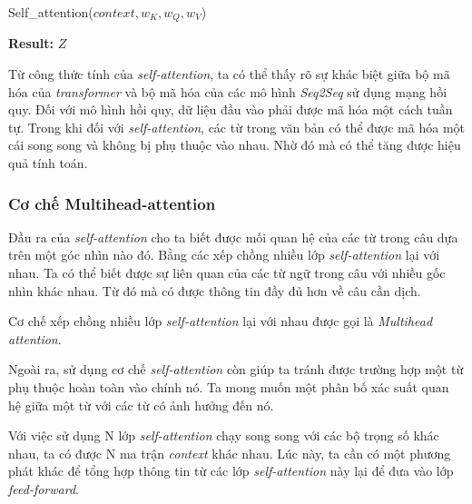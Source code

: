 \begin{algorithm}[H]
    \caption{Self\_attention($context, w_K, w_Q, w_V$)}
    \begin{algorithmic}[1]
		\State \textbf{Result:} $Z$
    \end{algorithmic}
\end{algorithm}

Từ công thức tính của \textit{self-attention}, ta có thể thấy rõ sự khác biệt giữa bộ mã hóa của \textit{transformer} và bộ mã hóa của các mô hình \textit{Seq2Seq} sử dụng mạng hồi quy. Đối với mô hình hồi quy, dữ liệu đầu vào phải được mã hóa một cách tuần tự. Trong khi đối với \textit{self-attention}, các từ trong văn bản có thể được mã hóa một cái song song và không bị phụ thuộc vào nhau. Nhờ đó mà có thể tăng được hiệu quả tính toán.

\subsubsection{Cơ chế Multihead-attention}
Đầu ra của \textit{self-attention} cho ta biết được mối quan hệ của các từ trong câu dựa trên một góc nhìn nào đó. Bằng các xếp chồng nhiều lớp \textit{self-attention} lại với nhau. Ta có thể biết được sự liên quan của các từ ngữ trong câu với nhiều gốc nhìn khác nhau. Từ đó mà có được thông tin đầy đủ hơn về câu cần dịch. 

Cơ chế xếp chồng nhiều lớp \textit{self-attention} lại với nhau được gọi là \textit{Multihead attention}. 

Ngoài ra, sử dụng cơ chế \textit{self-attention} còn giúp ta tránh được trường hợp một từ phụ thuộc hoàn toàn vào chính nó. Ta mong muốn một phân bố xác suất quan hệ giữa một từ với các từ có ảnh hưởng đến nó.

Với việc sử dụng N lớp \textit{self-attention} chạy song song với các bộ trọng số khác nhau, ta có được N ma trận \textit{context} khác nhau. Lúc này, ta cần có một phương phát khác để tổng hợp thông tin từ các lớp \textit{self-attention} này lại để đưa vào lớp \textit{feed-forward}. 

